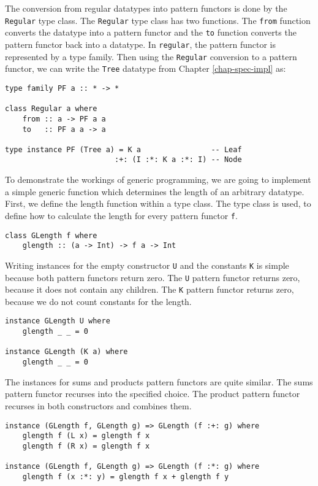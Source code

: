 The conversion from regular datatypes into pattern functors is done by the \texttt{Regular} type class. The \texttt{Regular} type class has two functions. The \texttt{from} function converts the datatype into a pattern functor and the \texttt{to} function converts the pattern functor back into a datatype. In \texttt{regular}, the pattern functor is represented by a type family. Then using the \texttt{Regular} conversion to a pattern functor, we can write the \texttt{Tree} datatype from Chapter \ref{chap-spec-impl} as:

\begin{verbatim}
type family PF a :: * -> *

class Regular a where
    from :: a -> PF a a
    to   :: PF a a -> a

type instance PF (Tree a) = K a                -- Leaf
                         :+: (I :*: K a :*: I) -- Node
\end{verbatim}

To demonstrate the workings of generic programming, we are going to implement a simple generic function which determines the length of an arbitrary datatype. First, we define the length function within a type class. The type class is used, to define how to calculate the length for every pattern functor \texttt{f}. 

\begin{verbatim}
class GLength f where
    glength :: (a -> Int) -> f a -> Int
\end{verbatim}

Writing instances for the empty constructor \texttt{U} and the constants \texttt{K} is simple because both pattern functors return zero. The \texttt{U} pattern functor returns zero, because it does not contain any children. The \texttt{K} pattern functor returns zero, because we do not count constants for the length. 

\begin{verbatim}
instance GLength U where
    glength _ _ = 0

instance GLength (K a) where
    glength _ _ = 0
\end{verbatim}

The instances for sums and products pattern functors are quite similar. The sums pattern functor recurses into the specified choice. The product pattern functor recurses in both constructors and combines them.

\begin{verbatim}
instance (GLength f, GLength g) => GLength (f :+: g) where
    glength f (L x) = glength f x
    glength f (R x) = glength f x

instance (GLength f, GLength g) => GLength (f :*: g) where
    glength f (x :*: y) = glength f x + glength f y
\end{verbatim}

